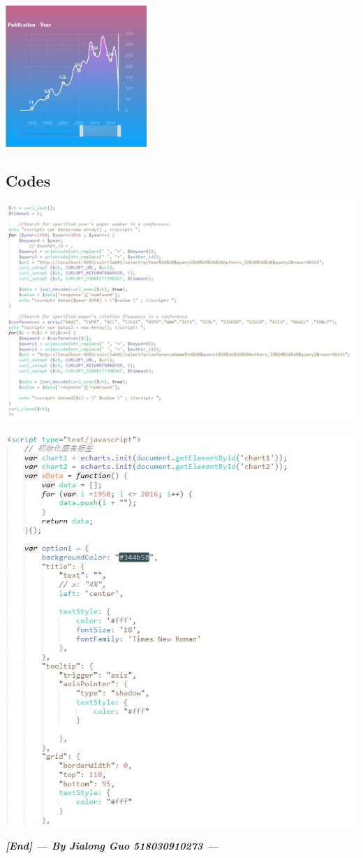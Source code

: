 \documentclass[10pt,twoside,a4paper,titlepage]{article}
\begin{document}
		\includegraphics[width=0.4\textwidth]{gjl/3.jpg}\newline\par
	\newpage
	\subsection{Codes}
		\includegraphics{gjl/15.jpg}\newline\par
		\includegraphics[width=1\textwidth]{gjl/14.jpg}\newline\par
		\textbf{\emph{[End] --- By Jialong Guo 518030910273 ---}}
\end{document}
